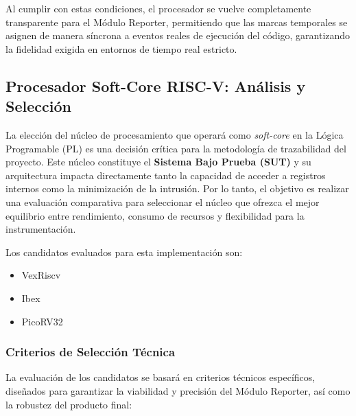 Al cumplir con estas condiciones, el procesador se vuelve completamente transparente para el Módulo Reporter, permitiendo que las marcas temporales se asignen de manera síncrona a eventos reales de ejecución del código, garantizando la fidelidad exigida en entornos de tiempo real estricto.
\subsection{Procesador Soft-Core RISC-V: Análisis y Selección}
\label{ssec:seleccion_softcore}

La elección del núcleo de procesamiento que operará como \textit{soft-core} en la Lógica Programable (PL) es una decisión crítica para la metodología de trazabilidad del proyecto. Este núcleo constituye el \textbf{Sistema Bajo Prueba (SUT)} y su arquitectura impacta directamente tanto la capacidad de acceder a registros internos como la minimización de la intrusión. Por lo tanto, el objetivo es realizar una evaluación comparativa para seleccionar el núcleo que ofrezca el mejor equilibrio entre rendimiento, consumo de recursos y flexibilidad para la instrumentación.

Los candidatos evaluados para esta implementación son:
\begin{itemize}
    \item VexRiscv
    \item Ibex
    \item PicoRV32
\end{itemize}

\subsubsection{Criterios de Selección Técnica}

La evaluación de los candidatos se basará en criterios técnicos específicos, diseñados para garantizar la viabilidad y precisión del Módulo Reporter, así como la robustez del producto final:

